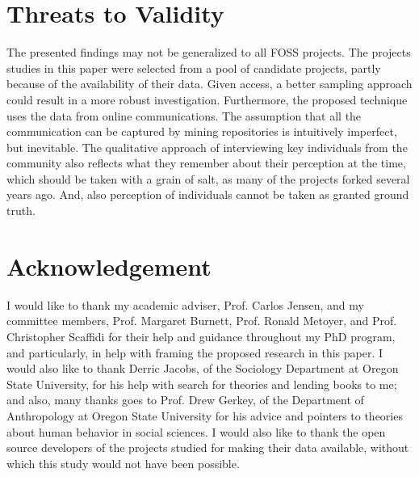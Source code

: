 \documentclass{acm_proc_article-sp}
\begin{document}
\section{Threats to Validity}
\label{threatsToValidity}
The presented findings may not be generalized to all FOSS projects. The projects studies in this paper were selected from a pool of candidate projects, partly because of the availability of their data. Given access, a better sampling approach could result in a more robust investigation. Furthermore, the proposed technique uses the data from online communications. The assumption that all the communication can be captured by mining repositories is intuitively imperfect, but inevitable. 
The qualitative approach of interviewing key individuals from the community also reflects what they remember about their perception at the time, which should be taken with a grain of salt, as many of the projects forked several years ago. And, also perception of individuals cannot be taken as granted ground truth. 


\section*{Acknowledgement}
\label{acknowledgements}
I would like to thank my academic adviser, Prof. Carlos Jensen, and my committee members, Prof. Margaret Burnett, Prof. Ronald Metoyer, and Prof. Christopher Scaffidi for their help and guidance throughout my PhD program, and particularly, in help with framing the proposed research in this paper. I would also like to thank Derric Jacobs, of the Sociology Department at Oregon State University, for his help with search for theories and lending books to me; and also, many thanks goes to Prof. Drew Gerkey, of the Department of Anthropology at Oregon State University for his advice and pointers to theories about human behavior in social sciences.
I would also like to thank the open source developers of the projects studied for making their data available, without which this study would not have been possible. \\

%


  

%
%
\end{document}

